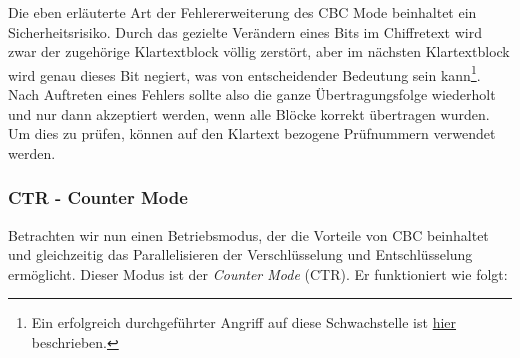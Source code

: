 Die eben erläuterte Art der Fehlererweiterung des CBC Mode beinhaltet ein Sicherheitsrisiko. Durch das gezielte Verändern eines Bits im Chiffretext wird zwar
der zugehörige Klartextblock völlig zerstört, aber im nächsten Klartextblock wird genau dieses Bit negiert, was von entscheidender Bedeutung sein kann\footnote{Ein erfolgreich durchgeführter Angriff auf diese Schwachstelle ist  \href{http://www.heise.de/security/artikel/Erfolgreicher-Angriff-auf-Linux-Verschluesselung-2072199.html}{hier} beschrieben.}. Nach
Auftreten eines Fehlers sollte also die ganze Übertragungsfolge wiederholt und nur dann akzeptiert werden, wenn alle Blöcke korrekt übertragen wurden. Um dies
zu prüfen, können auf den Klartext bezogene Prüfnummern verwendet werden.

\subsubsection{CTR - Counter Mode}

Betrachten wir nun einen Betriebsmodus, der die Vorteile von CBC beinhaltet und gleichzeitig das Parallelisieren der Verschlüsselung und Entschlüsselung ermöglicht. Dieser Modus ist der \textit{Counter Mode} (CTR). Er funktioniert wie folgt:

\begin{figure}[h]
	\centering
	\hfill
\end{figure}
\bigskip

